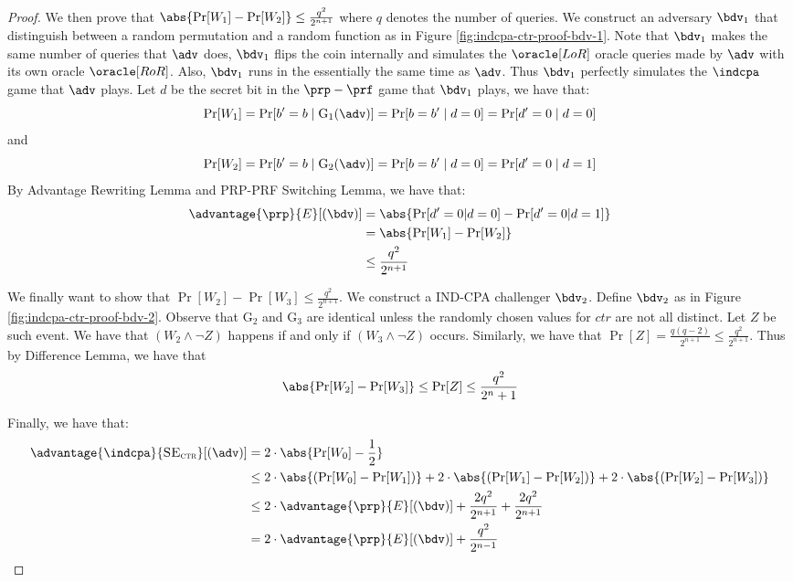 \documentclass[11pt,a4paper]{article}
\newcommand{\SE}{\textsc{SE}}
\begin{document}
\begin{proof}
We then prove that $\abs{\Pr[W_1] - \Pr[W_2]} \leq \frac{q^2}{2^{n+1}}$ where $q$ denotes the number of queries. We construct an adversary $\bdv_1$ that distinguish between a random permutation and a random function as in Figure \ref{fig:indcpa-ctr-proof-bdv-1}. Note that $\bdv_1$ makes the same number of queries that $\adv$ does, $\bdv_1$ flips the coin internally and simulates the $\oracle[LoR]$ oracle queries made by $\adv$ with its own oracle $\oracle[RoR]$. Also, $\bdv_1$ runs in the essentially the same time as $\adv$. Thus $\bdv_1$ perfectly simulates the $\indcpa$ game that $\adv$ plays. Let $d$ be the secret bit in the $\prp-\prf$ game that $\bdv_1$ plays, we have that: 
$$
\Pr[W_1] = \Pr[b'=b \mid \mathrm{G_1}(\adv)] = \Pr[b=b' \mid d = 0] = \Pr[d' = 0 \mid d = 0]
$$
and 
$$
\Pr[W_2] = \Pr[b'=b \mid \mathrm{G_2}(\adv)] = \Pr[b=b' \mid d = 0] = \Pr[d' = 0 \mid d = 1]
$$
By Advantage Rewriting Lemma and PRP-PRF Switching Lemma, we have that: 
$$
\begin{aligned}
\advantage{\prp}{E}[(\bdv)] &= \abs{\Pr[d' = 0 | d = 0] - \Pr[d'=0 | d = 1]}  \\ 
&= \abs{\Pr[W_1] - \Pr[W_2]} \\ 
&\leq \frac{q^2}{2^{n+1}}
\end{aligned} 
$$

We finally want to show that $\Pr[W_2] - \Pr[W_3] \leq \frac{q^2}{2^{n+1}}$. We construct a IND-CPA challenger $\bdv_2$. Define $\bdv_2$ as in Figure \ref{fig:indcpa-ctr-proof-bdv-2}. Observe that $\mathrm{G}_2$ and $\mathrm{G}_3$ are identical unless the randomly chosen values for $ctr$ are not all distinct. Let $Z$ be such event. We have that $(W_2 \wedge \neg Z)$ happens if and only if $(W_3 \wedge \neg Z)$ occurs. Similarly, we have that $\Pr[Z] = \frac{q(q-2)}{2^{n+1}} \leq \frac{q^2}{2^{n+1}}$. Thus by Difference Lemma, we have that 
$$
\abs{\Pr[W_2] - \Pr[W_3]} \leq \Pr[Z] \leq \frac{q^2}{2^n+1}
$$

Finally, we have that:
$$
\begin{aligned}
\advantage{\indcpa}{\SE_\textsc{ctr}}[(\adv)] &=  2 \cdot \abs{\Pr[W_0] - \frac{1}{2}}  \\
&\leq 2 \cdot \abs{(\Pr[W_0] - \Pr[W_1])} + 2 \cdot \abs{(\Pr[W_1] - \Pr[W_2])} + 2 \cdot \abs{(\Pr[W_2] - \Pr[W_3])} \\ 
&\leq 2 \cdot \advantage{\prp}{E}[(\bdv)] + \frac{2q^2}{2^{n+1}} + \frac{2q^2}{2^{n+1}} \\
&= 2 \cdot \advantage{\prp}{E}[(\bdv)] + \frac{q^2}{2^{n-1}} 
\end{aligned} 
$$
\end{proof} 
\end{document}
